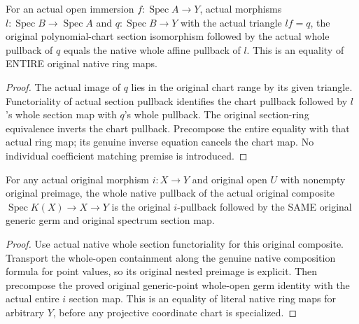 \begin{lemma}
\label{lem:seven-actual-affine-chart-factor-whole-sections-route}
\leanok
{}
For an actual open immersion $f:\operatorname{Spec}A\to Y$, actual
morphisms $l:\operatorname{Spec}B\to\operatorname{Spec}A$ and
$q:\operatorname{Spec}B\to Y$ with the actual triangle $lf=q$,
the original polynomial-chart section isomorphism followed by the
actual whole pullback of $q$ equals the native whole affine pullback
of $l$. This is an equality of ENTIRE original native ring maps.
\end{lemma}
\begin{proof}
The actual image of $q$ lies in the original chart range by its given
triangle. Functoriality of actual section pullback identifies the
chart pullback followed by $l$'s whole section map with $q$'s whole
pullback. The original section-ring equivalence inverts the chart
pullback. Precompose the entire equality with that actual ring map;
its genuine inverse equation cancels the chart map. No individual
coefficient matching premise is introduced.
\end{proof}

\begin{lemma}
\label{lem:seven-original-generic-composite-whole-germ-route}
\leanok
{}
For any actual original morphism $i:X\to Y$ and original open $U$
with nonempty original preimage, the whole native pullback of the
actual original composite $\operatorname{Spec}K(X)\to X\to Y$
is the original $i$-pullback followed by the SAME original generic
germ and original spectrum section map.
\end{lemma}
\begin{proof}
Use actual native whole section functoriality for this original
composite. Transport the whole-open containment along the genuine native composition formula for point values, so its original nested preimage is explicit. Then precompose the proved original generic-point
whole-open germ identity with the actual entire $i$ section map.
This is an equality of literal native ring maps for arbitrary $Y$,
before any projective coordinate chart is specialized.
\end{proof}

